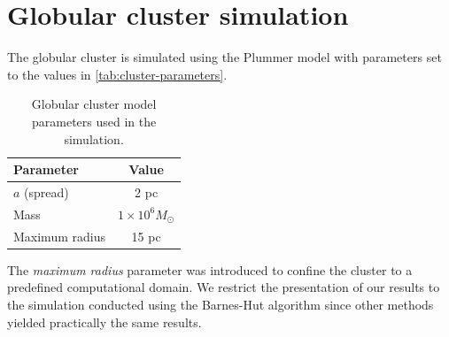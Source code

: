 \section{Globular cluster simulation}
The globular cluster is simulated using the Plummer model with parameters set to the values in \autoref{tab:cluster-parameters}.
\begin{table}[htp]
    \centering
    \caption{Globular cluster model parameters used in the simulation.}
    \label{tab:cluster-parameters}
    \begin{tabular}{lc}
        \toprule
        \textbf{Parameter} & \textbf{Value}          \\
        \midrule
        $a$ (spread)       & 2 pc                    \\
        Mass               & $1 \times 10^6 M_\odot$ \\
        Maximum radius     & 15 pc                   \\
        \bottomrule
    \end{tabular}
\end{table}
The \textit{maximum radius} parameter was introduced to confine the cluster to a predefined computational domain.
We restrict the presentation of our results to the simulation conducted using the Barnes-Hut algorithm since other methods yielded practically the same results.

